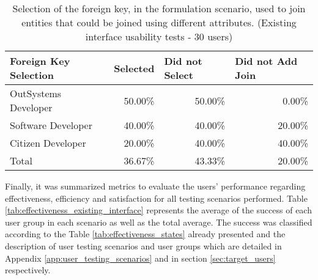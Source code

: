 \begin{table}[tb]
    \caption{Selection of the foreign key, in the formulation scenario, used to join entities that could be joined using different attributes. (Existing interface usability tests - 30 users)}
    \label{tab:existingInterfaceForeignKeySelection}
    \begin{tabular}{@{}lrrr@{}}
    \toprule
    \textbf{Foreign Key Selection} & \multicolumn{1}{l}{Selected} & \multicolumn{1}{l}{Did not Select} & \multicolumn{1}{l}{Did not Add Join} \\ \midrule
    OutSystems Developer           & 50.00\%                      & 50.00\%                            & 0.00\%                               \\
    Software Developer             & 40.00\%                      & 40.00\%                            & 20.00\%                              \\
    Citizen Developer              & 20.00\%                      & 40.00\%                            & 40.00\%                              \\
    Total                          & 36.67\%                      & 43.33\%                            & 20.00\%                              \\ \bottomrule
    \end{tabular}
    \end{table}

Finally, it was summarized metrics to evaluate the users' performance regarding effectiveness, efficiency and satisfaction for all testing scenarios performed. Table \ref{tab:effectiveness_existing_interface} represents the average of the success of each user group in each scenario as well as the total average. The success was classified according to the Table \ref{tab:effectiveness_states} already presented and the description of user testing scenarios and user groups which are detailed in Appendix \ref{app:user_testing_scenarios} and in section \ref{sec:target_users} respectively.


